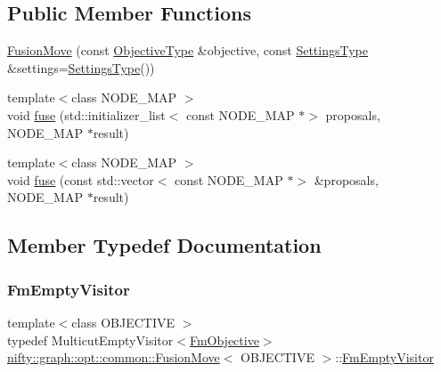 \subsection*{Public Member Functions}
\begin{DoxyCompactItemize}
\item 
\hyperlink{classnifty_1_1graph_1_1opt_1_1common_1_1FusionMove_a9959f5a6aeaae5cccd0d6f7630a14196}{Fusion\+Move} (const \hyperlink{classnifty_1_1graph_1_1opt_1_1common_1_1FusionMove_a8e60c3d0397b2a2b49bdc8f302a65d93}{Objective\+Type} \&objective, const \hyperlink{structnifty_1_1graph_1_1opt_1_1common_1_1FusionMove_1_1SettingsType}{Settings\+Type} \&settings=\hyperlink{structnifty_1_1graph_1_1opt_1_1common_1_1FusionMove_1_1SettingsType}{Settings\+Type}())
\item 
{\footnotesize template$<$class N\+O\+D\+E\+\_\+\+M\+AP $>$ }\\void \hyperlink{classnifty_1_1graph_1_1opt_1_1common_1_1FusionMove_a4a5cba40389e36c65308e9ccb8e1bec2}{fuse} (std\+::initializer\+\_\+list$<$ const N\+O\+D\+E\+\_\+\+M\+AP $\ast$$>$ proposals, N\+O\+D\+E\+\_\+\+M\+AP $\ast$result)
\item 
{\footnotesize template$<$class N\+O\+D\+E\+\_\+\+M\+AP $>$ }\\void \hyperlink{classnifty_1_1graph_1_1opt_1_1common_1_1FusionMove_ade8382ba036c3e513364aa724476e7aa}{fuse} (const std\+::vector$<$ const N\+O\+D\+E\+\_\+\+M\+AP $\ast$$>$ \&proposals, N\+O\+D\+E\+\_\+\+M\+AP $\ast$result)
\end{DoxyCompactItemize}


\subsection{Member Typedef Documentation}
\mbox{\label{classnifty_1_1graph_1_1opt_1_1common_1_1FusionMove_a0cf98a9b7c916eb62da979846de0a47d}} 
\subsubsection{\texorpdfstring{Fm\+Empty\+Visitor}{FmEmptyVisitor}}
{\footnotesize\ttfamily template$<$class O\+B\+J\+E\+C\+T\+I\+VE $>$ \\
typedef Multicut\+Empty\+Visitor$<$\hyperlink{classnifty_1_1graph_1_1opt_1_1common_1_1FusionMove_a238d47fabd4bf7f5a923885f9203536c}{Fm\+Objective}$>$ \hyperlink{classnifty_1_1graph_1_1opt_1_1common_1_1FusionMove}{nifty\+::graph\+::opt\+::common\+::\+Fusion\+Move}$<$ O\+B\+J\+E\+C\+T\+I\+VE $>$\+::\hyperlink{classnifty_1_1graph_1_1opt_1_1common_1_1FusionMove_a0cf98a9b7c916eb62da979846de0a47d}{Fm\+Empty\+Visitor}}


